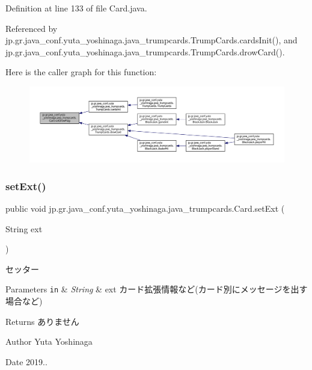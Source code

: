 Definition at line 133 of file Card.\+java.



Referenced by jp.\+gr.\+java\+\_\+conf.\+yuta\+\_\+yoshinaga.\+java\+\_\+trumpcards.\+Trump\+Cards.\+cards\+Init(), and jp.\+gr.\+java\+\_\+conf.\+yuta\+\_\+yoshinaga.\+java\+\_\+trumpcards.\+Trump\+Cards.\+drow\+Card().

Here is the caller graph for this function\+:
\nopagebreak
\begin{figure}[H]
\begin{center}
\leavevmode
\includegraphics[width=350pt]{classjp_1_1gr_1_1java__conf_1_1yuta__yoshinaga_1_1java__trumpcards_1_1_card_a52e0de709fd788e13ad930562e8e4be2_icgraph}
\end{center}
\end{figure}
\mbox{\label{classjp_1_1gr_1_1java__conf_1_1yuta__yoshinaga_1_1java__trumpcards_1_1_card_a883f9a927c94481d9fd2f3a226499b23}} 
\subsubsection{\texorpdfstring{set\+Ext()}{setExt()}}
{\footnotesize\ttfamily public void jp.\+gr.\+java\+\_\+conf.\+yuta\+\_\+yoshinaga.\+java\+\_\+trumpcards.\+Card.\+set\+Ext (\begin{DoxyParamCaption}\item[{String}]{ext }\end{DoxyParamCaption})}



セッター 


\begin{DoxyParams}[1]{Parameters}
\mbox{\tt in}  & {\em String} & ext カード拡張情報など(カード別にメッセージを出す場合など) \\
\hline
\end{DoxyParams}
\begin{DoxyReturn}{Returns}
ありません 
\end{DoxyReturn}
\begin{DoxyAuthor}{Author}
Yuta Yoshinaga 
\end{DoxyAuthor}
\begin{DoxyDate}{Date}
2019.. 
\end{DoxyDate}


